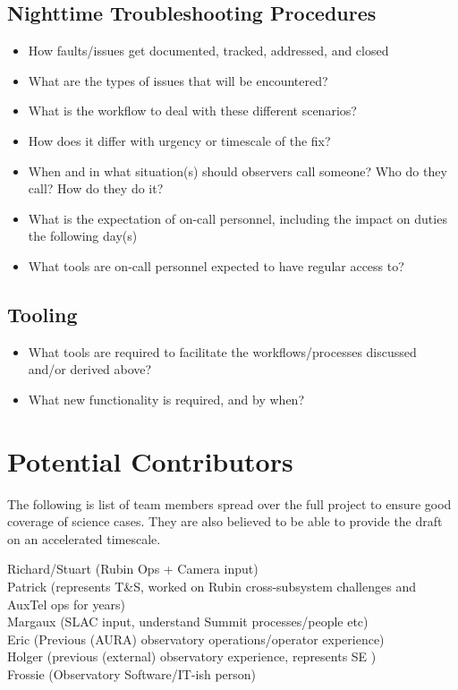 \documentclass[SE,authoryear,toc]{lsstdoc}
\begin{document}
\subsection{Nighttime Troubleshooting Procedures}
\begin{itemize}
\item How faults/issues get documented, tracked, addressed, and closed
\item What are the types of issues that will be encountered?
\item What is the workflow to deal with these different scenarios?
\item How does it differ with urgency or timescale of the fix?
\item When and in what situation(s) should observers call someone? 
      Who do they call? 
      How do they do it? 
\item What is the expectation of on-call personnel, including the impact on duties the following day(s)
\item What tools are on-call personnel expected to have regular access to?
\end{itemize}

\subsection{Tooling}
\begin{itemize}
\item What tools are required to facilitate the workflows/processes discussed and/or derived above?
\item What new functionality is required, and by when?
\end{itemize}


\section{Potential Contributors}
The following is list of team members spread over the full project to ensure good coverage of science cases. 
They are also believed to be able to provide the draft on an accelerated timescale.

Richard/Stuart (Rubin Ops + Camera input)\\
Patrick (represents T\&S, worked on Rubin cross-subsystem challenges and AuxTel ops for years)\\
Margaux (SLAC input, understand Summit processes/people etc)\\
Eric (Previous (AURA) observatory operations/operator experience)\\
Holger (previous (external) observatory experience, represents SE )\\
Frossie (Observatory Software/IT-ish person)\\
\end{document}
